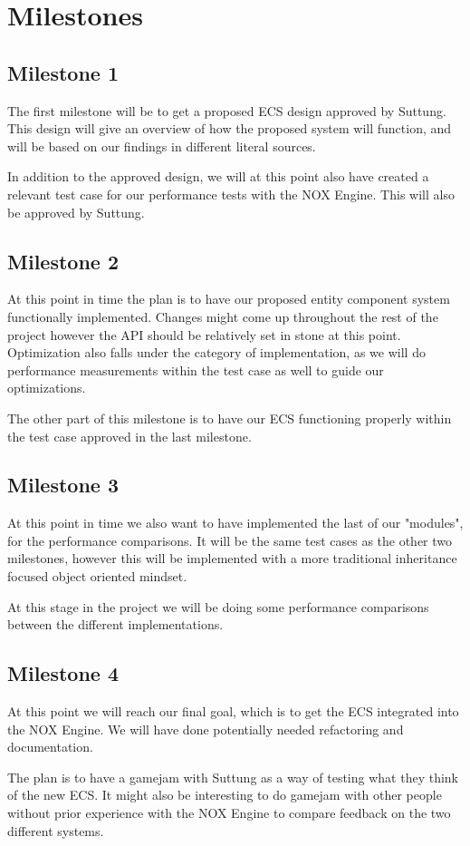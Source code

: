 \section*{Milestones}
\subsection*{Milestone 1}
The first milestone will be to get a proposed ECS design approved by Suttung.
This design will give an overview of how the proposed system will function,
and will be based on our findings in different literal sources.

In addition to the approved design, we will at this point also have created a
relevant test case for our performance tests with the NOX Engine. 
This will also be approved by Suttung.

\subsection*{Milestone 2}
At this point in time the plan is to have our proposed entity component system
functionally implemented. Changes might come up throughout the rest of the project
however the API should be relatively set in stone at this point.
Optimization also falls under the category of implementation, as we will do 
performance measurements within the test case as well to guide our optimizations.

The other part of this milestone is to have our ECS functioning properly within
the test case approved in the last milestone. 

\subsection*{Milestone 3}
At this point in time we also want to have implemented the last of our "modules",
for the performance comparisons. It will be the same test cases as the other two
milestones, however this will be implemented with a more traditional inheritance focused
object oriented mindset.

At this stage in the project we will be doing some performance comparisons between
the different implementations.

\subsection*{Milestone 4}
At this point we will reach our final goal, which is to get the ECS integrated into the NOX Engine.
We will have done potentially needed refactoring and documentation.

The plan is to have a gamejam with Suttung as a way of testing what they think of the new ECS.
It might also be interesting to do gamejam with other people without prior experience with the NOX Engine
to compare feedback on the two different systems.
